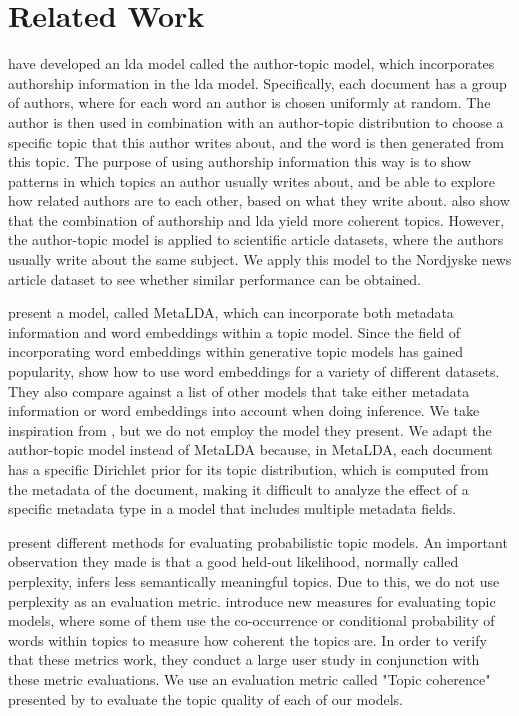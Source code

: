 \section{Related Work}\label{sec:related_work}

\citet{author_topic_2012} have developed an \gls{lda} model called the author-topic model, which incorporates authorship information in the \gls{lda} model.
Specifically, each document has a group of authors, where for each word an author is chosen uniformly at random.
The author is then used in combination with an author-topic distribution to choose a specific topic that this author writes about, and the word is then generated from this topic.
The purpose of using authorship information this way is to show patterns in which topics an author usually writes about, and be able to explore how related authors are to each other, based on what they write about.
\citeauthor{author_topic_2012} also show that the combination of authorship and \gls{lda} yield more coherent topics.
However, the author-topic model is applied to scientific article datasets, where the authors usually write about the same subject.
We apply this model to the Nordjyske news article dataset to see whether similar performance can be obtained.

\citet{MetaLDA2017} present a model, called MetaLDA, which can incorporate both metadata information and word embeddings within a topic model.
Since the field of incorporating word embeddings within generative topic models has gained popularity\cite{dieng2020topic}, \citet{MetaLDA2017} show how to use word embeddings for a variety of different datasets.
They also compare against a list of other models that take either metadata information or word embeddings into account when doing inference.
We take inspiration from \citet{MetaLDA2017}, but we do not employ the model they present. 
We adapt the author-topic model instead of MetaLDA because, in MetaLDA, each document has a specific Dirichlet prior for its topic distribution, which is computed from the metadata of the document, making it difficult to analyze the effect of a specific metadata type in a model that includes multiple metadata fields.

\citet{tea_leaves} present different methods for evaluating probabilistic topic models. 
An important observation they made is that a good held-out likelihood, normally called perplexity, infers less semantically meaningful topics.
Due to this, we do not use perplexity as an evaluation metric.
\citet{topic_coherence_2015} introduce new measures for evaluating topic models, where some of them use the co-occurrence or conditional probability of words within topics to measure how coherent the topics are. 
In order to verify that these metrics work, they conduct a large user study in conjunction with these metric evaluations.
We use an evaluation metric called "Topic coherence" presented by \citet{topic_coherence_2015} to evaluate the topic quality of each of our models.

